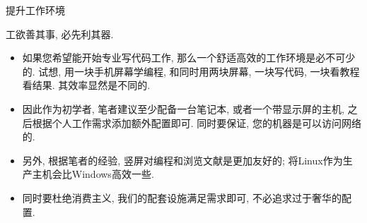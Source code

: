 \documentclass{beamer}
\begin{document}
    \begin{frame}{提升工作环境}
      \begin{block}{工欲善其事, 必先利其器.} 
        \begin{itemize}
          \item 如果您希望能开始专业写代码工作, 那么一个舒适高效的工作环境是必不可少的. 试想, 用一块手机屏幕学编程, 和同时用两块屏幕, 一块写代码, 一块看教程看结果. 其效率显然是不同的. 
          \item 因此作为初学者, 笔者建议至少配备一台笔记本, 或者一个带显示屏的主机, 之后根据个人工作需求添加额外配置即可. 同时要保证, 您的机器是可以访问网络的.
          \item 另外, 根据笔者的经验, 竖屏对编程和浏览文献是更加友好的; 将Linux作为生产主机会比Windows高效一些.
          \item 同时要杜绝消费主义, 我们的配套设施满足需求即可, 不必追求过于奢华的配置.
        \end{itemize}    
      \end{block}
    \end{frame}
\end{document}
